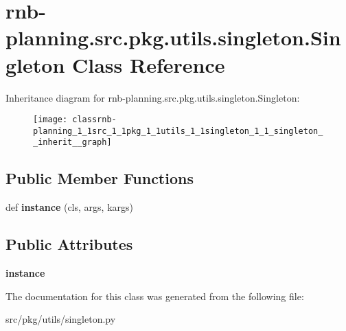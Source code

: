 \hypertarget{classrnb-planning_1_1src_1_1pkg_1_1utils_1_1singleton_1_1_singleton}{}\section{rnb-\/planning.src.\+pkg.\+utils.\+singleton.\+Singleton Class Reference}
\label{classrnb-planning_1_1src_1_1pkg_1_1utils_1_1singleton_1_1_singleton}


Inheritance diagram for rnb-\/planning.src.\+pkg.\+utils.\+singleton.\+Singleton\+:\nopagebreak
\begin{figure}[H]
\begin{center}
\leavevmode
\texttt{[image: classrnb-planning\_1\_1src\_1\_1pkg\_1\_1utils\_1\_1singleton\_1\_1\_singleton\_\_inherit\_\_graph]}
\end{center}
\end{figure}
\subsection*{Public Member Functions}
\begin{DoxyCompactItemize}
\item 
\mbox{\label{classrnb-planning_1_1src_1_1pkg_1_1utils_1_1singleton_1_1_singleton_ab2d4703186ff50c41372439517045bf6}} 
def {\bfseries instance} (cls, args, kargs)
\end{DoxyCompactItemize}
\subsection*{Public Attributes}
\begin{DoxyCompactItemize}
\item 
\mbox{\label{classrnb-planning_1_1src_1_1pkg_1_1utils_1_1singleton_1_1_singleton_aba2f3c0282609ccbd36e6d105691f1ec}} 
{\bfseries instance}
\end{DoxyCompactItemize}


The documentation for this class was generated from the following file\+:\begin{DoxyCompactItemize}
\item 
src/pkg/utils/singleton.\+py\end{DoxyCompactItemize}
